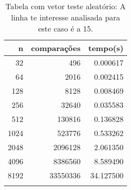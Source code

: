 \begin{table}[ht]
\centering
\begin{tabular}{rrr} \toprule
        n &    comparações &       tempo(s) \\ \midrule
      32  &            496 &      0.000617 \\
      64  &           2016 &      0.002415 \\
     128  &           8128 &      0.008469 \\
     256  &          32640 &      0.035583 \\
     512  &         130816 &      0.136828 \\
    1024  &         523776 &      0.533262 \\
    2048  &        2096128 &      2.061350 \\
    4096  &        8386560 &      8.589490 \\
    8192  &       33550336 &     34.127500 \\
\bottomrule\addlinespace
\end{tabular}
\caption{Tabela com vetor teste aleatório: A linha te interesse analisada para este caso é a 15.}
\label{tab:selectionsortAleatorio}
\end{table}
